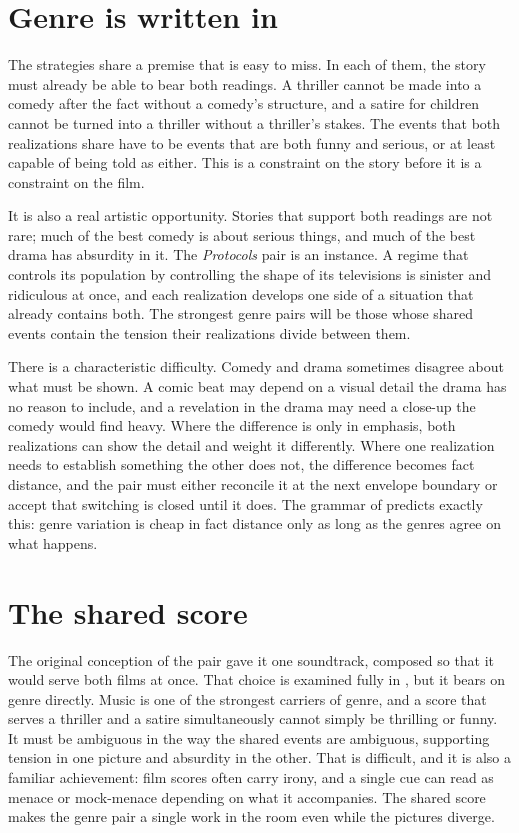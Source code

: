 \section{Genre is written in}

The strategies share a premise that is easy to miss. In each of them, the story must already be able to bear both readings. A thriller cannot be made into a comedy after the fact without a comedy's structure, and a satire for children cannot be turned into a thriller without a thriller's stakes. The events that both realizations share have to be events that are both funny and serious, or at least capable of being told as either. This is a constraint on the story before it is a constraint on the film.

It is also a real artistic opportunity. Stories that support both readings are not rare; much of the best comedy is about serious things, and much of the best drama has absurdity in it. The \emph{Protocols} pair is an instance. A regime that controls its population by controlling the shape of its televisions is sinister and ridiculous at once, and each realization develops one side of a situation that already contains both. The strongest genre pairs will be those whose shared events contain the tension their realizations divide between them.

There is a characteristic difficulty. Comedy and drama sometimes disagree about what must be shown. A comic beat may depend on a visual detail the drama has no reason to include, and a revelation in the drama may need a close-up the comedy would find heavy. Where the difference is only in emphasis, both realizations can show the detail and weight it differently. Where one realization needs to establish something the other does not, the difference becomes fact distance, and the pair must either reconcile it at the next envelope boundary or accept that switching is closed until it does. The grammar of  predicts exactly this: genre variation is cheap in fact distance only as long as the genres agree on what happens.

\section{The shared score}

The original conception of the pair gave it one soundtrack, composed so that it would serve both films at once. That choice is examined fully in , but it bears on genre directly. Music is one of the strongest carriers of genre, and a score that serves a thriller and a satire simultaneously cannot simply be thrilling or funny. It must be ambiguous in the way the shared events are ambiguous, supporting tension in one picture and absurdity in the other. That is difficult, and it is also a familiar achievement: film scores often carry irony, and a single cue can read as menace or mock-menace depending on what it accompanies. The shared score makes the genre pair a single work in the room even while the pictures diverge.

